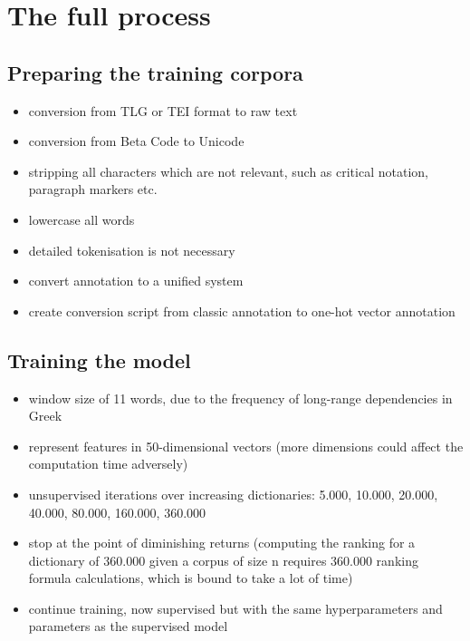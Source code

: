 \section{The full process}
\label{sec:process}

\subsection{Preparing the training corpora}
\label{sec:trainingcorpora}
\begin{itemize}
\item conversion from TLG or TEI format to raw text
\item conversion from Beta Code to Unicode
\item stripping all characters which are not relevant, such as
critical notation, paragraph markers etc.
\item lowercase all words
\item detailed tokenisation is not necessary
\item convert annotation to a unified system
\item create conversion script from classic annotation to one-hot vector annotation
\end{itemize}

\subsection{Training the model}
\label{sec:createmodel}
\begin{itemize}
\item window size of 11 words, due to the frequency of long-range dependencies in Greek
\item represent features in 50-dimensional vectors (more dimensions
  could affect the computation time adversely)
\item unsupervised iterations over increasing dictionaries: 5.000,
10.000, 20.000, 40.000, 80.000, 160.000, 360.000
\item stop at the point of diminishing returns (computing the ranking
for a dictionary of 360.000 given a corpus of size n requires 360.000
ranking formula calculations, which is bound to take a lot of time)
\item continue training, now supervised but with the same hyperparameters and parameters as the supervised model
\end{itemize}

